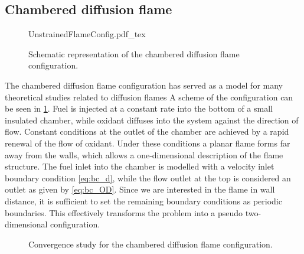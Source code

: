 
\subsection{Chambered diffusion flame}\label{ss:UDF}
\begin{figure}[b]
	\begin{center}
		\def\svgwidth{0.8\textwidth}
		{UnstrainedFlameConfig.pdf_tex}
		\caption{Schematic representation of the chambered diffusion flame configuration. }
		\label{fig:chamberedDifFlame}
	\end{center}
\end{figure}

The chambered diffusion flame configuration has served as a model for many theoretical studies related to diffusion flames\cite{matalonEffectThermalExpansion2010,rameauNumericalBifurcationChambered1985,matalonDiffusionFlamesChamber1980} A scheme of the configuration can be seen in \cref{fig:chamberedDifFlame}. Fuel is injected at a constant rate into the bottom of a small insulated chamber, while oxidant diffuses into the system against the direction of flow. Constant conditions at the outlet of the chamber are achieved by a rapid renewal of the flow of oxidant.  Under these conditions a planar flame forms far away from the walls, which allows a one-dimensional description of the flame structure.
The fuel inlet into the chamber is modelled with a velocity inlet boundary condition \cref{eq:bc_d}, while the flow outlet at the top is considered an outlet as given by \cref{eq:bc_OD}. Since we are interested in the flame in wall distance, it is sufficient to set the remaining boundary conditions as periodic boundaries. This effectively transforms the problem into a pseudo two-dimensional configuration.


\begin{figure}[t!]
	\centering
	\pgfplotsset{width=0.34\textwidth, compat=1.3}
	\caption{Convergence study for the chambered diffusion flame configuration.}
	\label{ConvergenceDiffFlame}
\end{figure}

